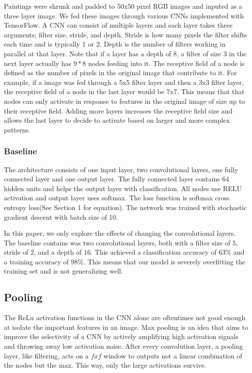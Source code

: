 \documentclass[10pt,twoside]{article}
\begin{document}
\noindent Paintings were shrunk and padded to 50x50 pixel RGB images and inputed as a three layer image. We fed these images through various CNNs implemented with TensorFlow. A CNN can consist of multiple layers and each layer takes three arguments; filter size, stride, and depth. Stride is how many pixels the filter shifts each time and is typically 1 or 2. Depth is the number of filters working in parallel at that layer. Note that if a layer has a depth of 8, a filter of size 3 in the next layer actually has $9*8$ nodes feeding into it. The receptive field of a node is defined as the number of pixels in the original image that contribute to it. For example, if a image was fed through a 5x5 filter layer and then a 3x3 filter layer, the receptive field of a node in the last layer would be 7x7. This means that that nodes can only activate in response to features in the original image of size up to their receptive field. Adding more layers increases the receptive field size and allows the last layer to decide to activate based on larger and more complex patterns.

\subsubsection{Baseline}
 The architecture consists of one input layer, two convolutional layers, one fully connected layer and one output layer. The fully connected layer contains 64 hidden units and helps the output layer with classification. All nodes use RELU activation and output layer uses softmax. The loss function is softmax cross entropy loss(See Section 1 for equation). The network was trained with stochastic gradient descent with batch size of 10.

 In this paper, we only explore the effects of changing the convolutional layers. The baseline contains was two convolutional layers, both with a filter size of $5$, stride of $2$, and a depth of 16. This achieved a classification accuracy of $63\%$ and a training accuracy of $98\%$. This means that our model is severely overfitting the training set and is not generalizing well.

\subsection{Pooling}
The ReLu activation functions in the CNN alone are oftentimes not good enough at isolate the important features in an image. Max pooling is an idea that aims to improve the selectivity of a CNN by actively amplifying high activation signals and throwing away low activation noise. After every convolution layer, a pooling layer, like filtering, acts on a $fxf$ window to outputs not a linear combination of the nodes but the max. This way, only the large activations survive. 
\end{document}
